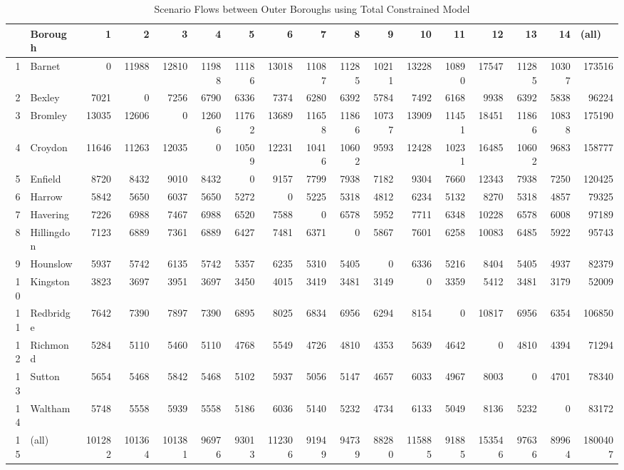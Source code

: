 \documentclass[11pt]{article} %
\begin{document}
\begin{table}
\footnotesize
\caption{Scenario Flows between Outer Boroughs using Total Constrained Model}
\begin{tabular}{|r|l|r|r|r|r|r|r|r|r|r|r|r|r|r|r|r|}
\hline
\multicolumn{1}{|l|}{} & Borough & 1 & 2 & 3 & 4 & 5 & 6 & 7 & 8 & 9 & 10 & 11 & 12 & 13 & 14 & \multicolumn{1}{l|}{(all)} \\ \hline
1 & Barnet & 0 & 11988 & 12810 & 11988 & 11186 & 13018 & 11087 & 11285 & 10211 & 13228 & 10890 & 17547 & 11285 & 10307 & 173516 \\ \hline
2 & Bexley & 7021 & 0 & 7256 & 6790 & 6336 & 7374 & 6280 & 6392 & 5784 & 7492 & 6168 & 9938 & 6392 & 5838 & 96224 \\ \hline
3 & Bromley & 13035 & 12606 & 0 & 12606 & 11762 & 13689 & 11658 & 11866 & 10737 & 13909 & 11451 & 18451 & 11866 & 10838 & 175190 \\ \hline
4 & Croydon & 11646 & 11263 & 12035 & 0 & 10509 & 12231 & 10416 & 10602 & 9593 & 12428 & 10231 & 16485 & 10602 & 9683 & 158777 \\ \hline
5 & Enfield & 8720 & 8432 & 9010 & 8432 & 0 & 9157 & 7799 & 7938 & 7182 & 9304 & 7660 & 12343 & 7938 & 7250 & 120425 \\ \hline
6 & Harrow & 5842 & 5650 & 6037 & 5650 & 5272 & 0 & 5225 & 5318 & 4812 & 6234 & 5132 & 8270 & 5318 & 4857 & 79325 \\ \hline
7 & Havering & 7226 & 6988 & 7467 & 6988 & 6520 & 7588 & 0 & 6578 & 5952 & 7711 & 6348 & 10228 & 6578 & 6008 & 97189 \\ \hline
8 & Hillingdon & 7123 & 6889 & 7361 & 6889 & 6427 & 7481 & 6371 & 0 & 5867 & 7601 & 6258 & 10083 & 6485 & 5922 & 95743 \\ \hline
9 & Hounslow & 5937 & 5742 & 6135 & 5742 & 5357 & 6235 & 5310 & 5405 & 0 & 6336 & 5216 & 8404 & 5405 & 4937 & 82379 \\ \hline
10 & Kingston & 3823 & 3697 & 3951 & 3697 & 3450 & 4015 & 3419 & 3481 & 3149 & 0 & 3359 & 5412 & 3481 & 3179 & 52009 \\ \hline
11 & Redbridge & 7642 & 7390 & 7897 & 7390 & 6895 & 8025 & 6834 & 6956 & 6294 & 8154 & 0 & 10817 & 6956 & 6354 & 106850 \\ \hline
12 & Richmond & 5284 & 5110 & 5460 & 5110 & 4768 & 5549 & 4726 & 4810 & 4353 & 5639 & 4642 & 0 & 4810 & 4394 & 71294 \\ \hline
13 & Sutton & 5654 & 5468 & 5842 & 5468 & 5102 & 5937 & 5056 & 5147 & 4657 & 6033 & 4967 & 8003 & 0 & 4701 & 78340 \\ \hline
14 & Waltham & 5748 & 5558 & 5939 & 5558 & 5186 & 6036 & 5140 & 5232 & 4734 & 6133 & 5049 & 8136 & 5232 & 0 & 83172 \\ \hline
15 & (all) & 101282 & 101364 & 101381 & 96976 & 93013 & 112306 & 91949 & 94739 & 88280 & 115885 & 91885 & 153546 & 97636 & 89964 & 1800407 \\ \hline
\end{tabular}
\label{Estimated Flows}
\end{table}
\end{document}
